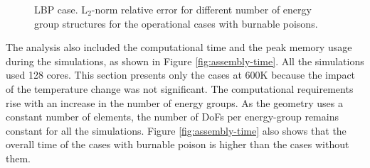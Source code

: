 \begin{figure}[htbp!]
	\centering
	\hfill
    \caption{LBP case. L$_2$-norm relative error for different number of energy group structures for the operational cases with burnable poisons.}
	\label{fig:assembly-LBP-er}
\end{figure}

The analysis also included the computational time and the peak memory usage during the simulations, as shown in Figure \ref{fig:assembly-time}.
All the simulations used 128 cores.
This section presents only the cases at 600K because the impact of the temperature change was not significant.
The computational requirements rise with an increase in the number of energy groups.
As the geometry uses a constant number of elements, the number of DoFs per energy-group remains constant for all the simulations.
Figure \ref{fig:assembly-time} also shows that the overall time of the cases with burnable poison is higher than the cases without them.

